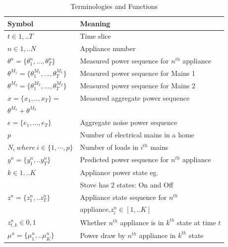 \documentclass[conference]{IEEEtran}
\begin{document}
\begin{table}[ht!]
\vspace{-12pt}
\caption{Terminologies and Functions}
\vspace{-8pt}
\label{tab:terms}
\begin{tabular}{|l|l|}
\hline
Symbol&Meaning\\[0.1cm]
\hline
$t\in {1,..T}$& Time slice\\[0.1cm]
\hline
$n\in{1,..N}$ & Appliance number\\[0.1cm]
\hline
$\theta^n=\{\theta_1^n,...,\theta_T^n\}$ & Measured power sequence for $n^{th}$ appliance\\[0.1cm]
\hline
$\theta^{M_1}=\{\theta_1^{M_1},...,\theta_T^{M_1}\}$ & Measured power sequence for Mains 1\\[0.1cm]
\hline
$\theta^{M_2}=\{\theta_1^{M_2},...,\theta_T^{M_2}\}$ & Measured power sequence for Mains 2\\[0.1cm]
\hline
$x=\{ x_1,..,x_T\}=$ & Measured aggregate power sequence\\[0.1cm]
$\theta^{M_1}+\theta^{M_2}$ &\\[0.1cm]
\hline
$e=\{e_1,...,e_T\}$ & Aggregate noise power sequence\\[0.1cm]
\hline
$p$ & Number of electrical mains in a home\\[0.1cm]
\hline
$N_i \:where\:i \in \{1,\cdots ,p\}$ & Number of loads in $i^{th}$ mains\\[0.1cm]
\hline
$y^n=\{y_1^n,..y_T^n\}$ & Predicted power sequence for $n^{th}$ appliance\\[0.1cm]
\hline
$k\in {1,..K}$ & Appliance power state eg. \\
&Stove has 2 states: On and Off\\[0.1cm]
\hline
$z^n=\{z_1^n,..z_T^n\}$ & Appliance state sequence for $n^{th}$ \\[0.1cm]
& appliance,$z_i^n \in [1,..K]$\\[0.1cm]
\hline
$z_{t,k}^n \in{0,1}$ & Whether $n^{th}$ appliance is in $k^{th}$ state at time $t$\\[0.1cm]
\hline 
$\mu^n=\{\mu_1^n,..\mu_K^n\}$ & Power draw by $n^{th}$ appliance in $k^{th}$ state\\[0.1cm]

\end{tabular}
\end{table}
\end{document}
